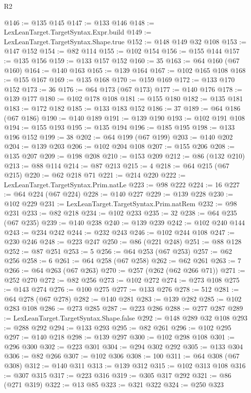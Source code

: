 \begin{lexlean}{R2}
\begin{coremodule}
@146 := @135 @145
@147 := @133 @146
@148 := LexLeanTarget.TargetSyntax.Expr.build
@149 := LexLeanTarget.TargetSyntax.Shape.true
@152 := @148 @149 @32 @108
@153 := @147 @152
@154 := @82 @114
@155 := @102 @154
@156 := @155 @144
@157 := @135 @156
@159 := @133 @157 @152
@160 := 35
@163 := @64 @160 (@67 @160)
@164 := @140 @163
@165 := @139 @164
@167 := @102 @165 @108
@168 := @155 @167
@169 := @135 @168
@170 := @159 @169
@172 := @133 @170 @152
@173 := 36
@176 := @64 @173 (@67 @173)
@177 := @140 @176
@178 := @139 @177
@180 := @102 @178 @108
@181 := @155 @180
@182 := @135 @181
@183 := @172 @182
@185 := @133 @183 @152
@186 := 37
@189 := @64 @186 (@67 @186)
@190 := @140 @189
@191 := @139 @190
@193 := @102 @191 @108
@194 := @155 @193
@195 := @135 @194
@196 := @185 @195
@198 := @133 @196 @152
@199 := 38
@202 := @64 @199 (@67 @199)
@203 := @140 @202
@204 := @139 @203
@206 := @102 @204 @108
@207 := @155 @206
@208 := @135 @207
@209 := @198 @208
@210 := @153 @209
@212 := @86 (@132 @210)
@213 := @88 @114
@214 := @87 @213
@215 := 4
@218 := @64 @215 (@67 @215)
@220 := @62 @218 @71
@221 := @214 @220
@222 := LexLeanTarget.TargetSyntax.Prim.natLe
@223 := @98 @222
@224 := 16
@227 := @64 @224 (@67 @224)
@228 := @140 @227
@229 := @139 @228
@230 := @102 @229
@231 := LexLeanTarget.TargetSyntax.Prim.natRem
@232 := @98 @231
@233 := @82 @218
@234 := @102 @233
@235 := 32
@238 := @64 @235 (@67 @235)
@239 := @140 @238
@240 := @139 @239
@242 := @102 @240 @144
@243 := @234 @242
@244 := @232 @243
@246 := @102 @244 @108
@247 := @230 @246
@248 := @223 @247
@250 := @86 (@221 @248)
@251 := @88 @128
@252 := @87 @251
@253 := 5
@256 := @64 @253 (@67 @253)
@257 := @62 @256
@258 := 6
@261 := @64 @258 (@67 @258)
@262 := @62 @261
@263 := 7
@266 := @64 @263 (@67 @263)
@270 := @257 (@262 (@62 @266 @71))
@271 := @252 @270
@272 := @82 @256
@273 := @102 @272
@274 := @273 @108
@275 := @143 @274
@276 := @100 @275
@277 := @133 @276
@278 := 512
@281 := @64 @278 (@67 @278)
@282 := @140 @281
@283 := @139 @282
@285 := @102 @283 @108
@286 := @273 @285
@287 := @223 @286
@288 := @277 @287
@289 := LexLeanTarget.TargetSyntax.Shape.false
@292 := @148 @289 @32 @108
@293 := @288 @292
@294 := @133 @293
@295 := @82 @261
@296 := @102 @295
@297 := @140 @218
@298 := @139 @297
@300 := @102 @298 @108
@301 := @296 @300
@302 := @223 @301
@304 := @294 @302 @292
@305 := @133 @304
@306 := @82 @266
@307 := @102 @306
@308 := 100
@311 := @64 @308 (@67 @308)
@312 := @140 @311
@313 := @139 @312
@315 := @102 @313 @108
@316 := @307 @315
@317 := @223 @316
@319 := @305 @317 @292
@321 := @86 (@271 @319)
@322 := @13 @85
@323 := @321 @322
@324 := @250 @323

\end{coremodule}
\end{lexlean}
